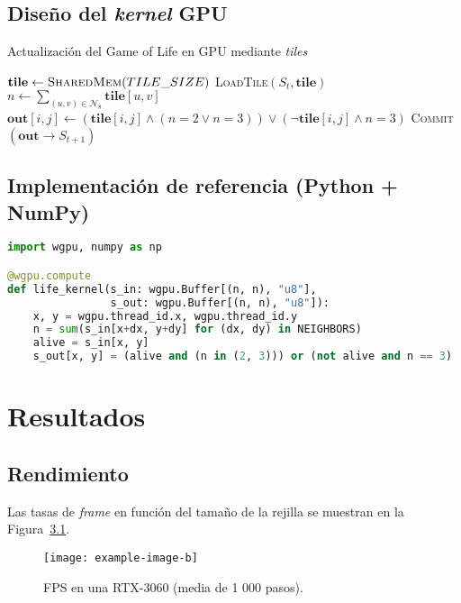 \documentclass{report}
\begin{document}
\section{Diseño del \emph{kernel} GPU}
\begin{algorithm}
  \caption{Actualización del Game of Life en GPU mediante \emph{tiles}}
  \label{alg:gpu-life}
  \begin{algorithmic}[1]
      \State $\textbf{tile} \gets \textsc{SharedMem}(TILE\_SIZE)$
      \State \textsc{LoadTile}$(S_t,\textbf{tile})$
      \Statex
        \State $n \gets \sum_{(u,v)\in\mathcal N_8} \textbf{tile}[u,v]$
        \State $\textbf{out}[i,j] \gets 
               ( \textbf{tile}[i,j] \wedge (n\!=\!2 \vee n\!=\!3))
               \vee (\lnot\textbf{tile}[i,j] \wedge n\!=\!3)$
      \EndFor
      \State \textsc{Commit}$(\textbf{out}\rightarrow S_{t+1})$
    \EndProcedure
  \end{algorithmic}
\end{algorithm}

\section{Implementación de referencia (Python + NumPy)}
\begin{lstlisting}[language=Python,
  caption={Python: Paso de Game of Life en WebGPU},label={lst:py-life}]
import wgpu, numpy as np

@wgpu.compute
def life_kernel(s_in: wgpu.Buffer[(n, n), "u8"],
                s_out: wgpu.Buffer[(n, n), "u8"]):
    x, y = wgpu.thread_id.x, wgpu.thread_id.y
    n = sum(s_in[x+dx, y+dy] for (dx, dy) in NEIGHBORS)
    alive = s_in[x, y]
    s_out[x, y] = (alive and (n in (2, 3))) or (not alive and n == 3)
\end{lstlisting}

\chapter{Resultados}
\section{Rendimiento}
Las tasas de \emph{frame} en función del tamaño de la rejilla se muestran en la
Figura~\cref{fig:fps-performance}.

\begin{figure}[ht]
  \centering
  \texttt{[image: example-image-b]}
  \caption{FPS en una RTX-3060 (media de 1 000 pasos).}
  \label{fig:fps-performance}
\end{figure}
\end{document}
